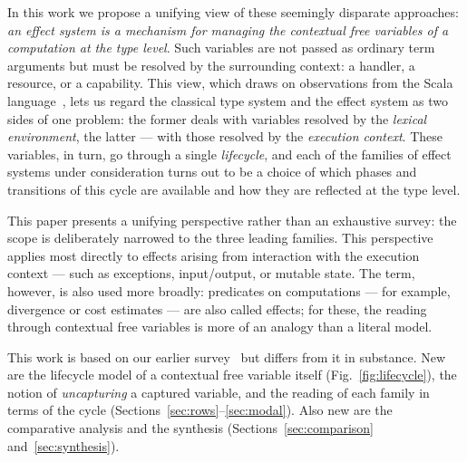 \documentclass[11pt]{article}
\begin{document}
In this work we propose a unifying view of these seemingly disparate approaches:
\emph{an effect system is a mechanism for managing the contextual free variables of a
computation at the type level}. Such variables are not passed as ordinary term arguments
but must be resolved by the surrounding context: a handler, a resource, or a capability.
This view, which draws on observations from the Scala language~\cite{odersky2021safer,
boruch2023capturing}, lets us regard the classical type system and the effect system as
two sides of one problem: the former deals with variables resolved by the \emph{lexical
environment}, the latter --- with those resolved by the \emph{execution context}. These
variables, in turn, go through a single \emph{lifecycle}, and each of the families of
effect systems under consideration turns out to be a choice of which phases and
transitions of this cycle are available and how they are reflected at the type level.

This paper presents a unifying perspective rather than an exhaustive survey: the scope
is deliberately narrowed to the three leading families. This perspective applies most
directly to effects arising from interaction with the execution context --- such as
exceptions, input/output, or mutable state. The term, however, is also used more
broadly: predicates on computations --- for example, divergence or cost estimates ---
are also called effects; for these, the reading through contextual free variables is
more of an analogy than a literal model.

This work is based on our earlier survey~\cite{stoyan2024modern} but differs from it in
substance. New are the lifecycle model of a contextual free variable itself
(Fig.~\ref{fig:lifecycle}), the notion of \emph{uncapturing} a captured variable, and
the reading of each family in terms of the cycle
(Sections~\ref{sec:rows}--\ref{sec:modal}). Also new are the comparative analysis and
the synthesis (Sections~\ref{sec:comparison} and~\ref{sec:synthesis}).
\end{document}

